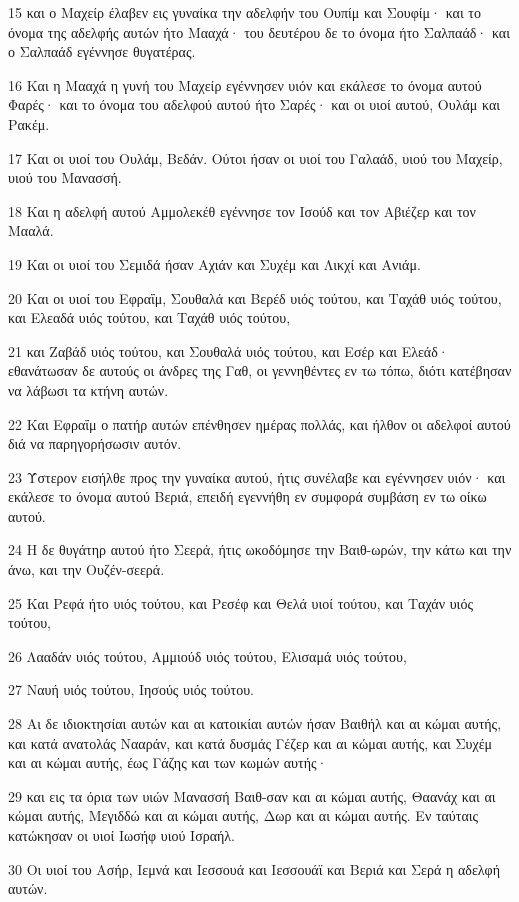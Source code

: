 \par 15 και ο Μαχείρ έλαβεν εις γυναίκα την αδελφήν του Ουπίμ και Σουφίμ· και το όνομα της αδελφής αυτών ήτο Μααχά· του δευτέρου δε το όνομα ήτο Σαλπαάδ· και ο Σαλπαάδ εγέννησε θυγατέρας.
\par 16 Και η Μααχά η γυνή του Μαχείρ εγέννησεν υιόν και εκάλεσε το όνομα αυτού Φαρές· και το όνομα του αδελφού αυτού ήτο Σαρές· και οι υιοί αυτού, Ουλάμ και Ρακέμ.
\par 17 Και οι υιοί του Ουλάμ, Βεδάν. Ούτοι ήσαν οι υιοί του Γαλαάδ, υιού του Μαχείρ, υιού του Μανασσή.
\par 18 Και η αδελφή αυτού Αμμολεκέθ εγέννησε τον Ισούδ και τον Αβιέζερ και τον Μααλά.
\par 19 Και οι υιοί του Σεμιδά ήσαν Αχιάν και Συχέμ και Λικχί και Ανιάμ.
\par 20 Και οι υιοί του Εφραΐμ, Σουθαλά και Βερέδ υιός τούτου, και Ταχάθ υιός τούτου, και Ελεαδά υιός τούτου, και Ταχάθ υιός τούτου,
\par 21 και Ζαβάδ υιός τούτου, και Σουθαλά υιός τούτου, και Εσέρ και Ελεάδ· εθανάτωσαν δε αυτούς οι άνδρες της Γαθ, οι γεννηθέντες εν τω τόπω, διότι κατέβησαν να λάβωσι τα κτήνη αυτών.
\par 22 Και Εφραΐμ ο πατήρ αυτών επένθησεν ημέρας πολλάς, και ήλθον οι αδελφοί αυτού διά να παρηγορήσωσιν αυτόν.
\par 23 Ύστερον εισήλθε προς την γυναίκα αυτού, ήτις συνέλαβε και εγέννησεν υιόν· και εκάλεσε το όνομα αυτού Βεριά, επειδή εγεννήθη εν συμφορά συμβάση εν τω οίκω αυτού.
\par 24 Η δε θυγάτηρ αυτού ήτο Σεερά, ήτις ωκοδόμησε την Βαιθ-ωρών, την κάτω και την άνω, και την Ουζέν-σεερά.
\par 25 Και Ρεφά ήτο υιός τούτου, και Ρεσέφ και Θελά υιοί τούτου, και Ταχάν υιός τούτου,
\par 26 Λααδάν υιός τούτου, Αμμιούδ υιός τούτου, Ελισαμά υιός τούτου,
\par 27 Ναυή υιός τούτου, Ιησούς υιός τούτου.
\par 28 Αι δε ιδιοκτησίαι αυτών και αι κατοικίαι αυτών ήσαν Βαιθήλ και αι κώμαι αυτής, και κατά ανατολάς Νααράν, και κατά δυσμάς Γέζερ και αι κώμαι αυτής, και Συχέμ και αι κώμαι αυτής, έως Γάζης και των κωμών αυτής·
\par 29 και εις τα όρια των υιών Μανασσή Βαιθ-σαν και αι κώμαι αυτής, Θαανάχ και αι κώμαι αυτής, Μεγιδδώ και αι κώμαι αυτής, Δωρ και αι κώμαι αυτής. Εν ταύταις κατώκησαν οι υιοί Ιωσήφ υιού Ισραήλ.
\par 30 Οι υιοί του Ασήρ, Ιεμνά και Ιεσσουά και Ιεσσουάϊ και Βεριά και Σερά η αδελφή αυτών.
